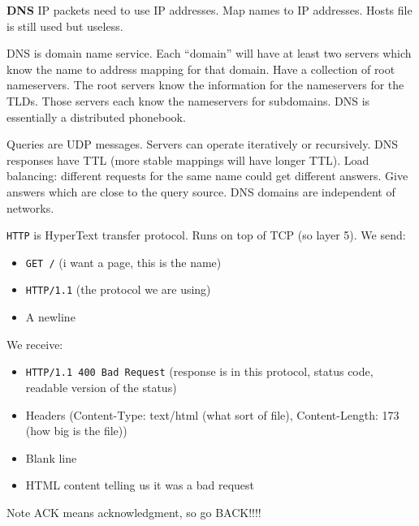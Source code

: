 \documentclass[10pt, a4paper]{article}
\begin{document}
\begin{multicols}{4}
    \textbf{DNS} IP packets need to use IP addresses. Map names to IP addresses. Hosts file is still used but useless.

    DNS is domain name service. Each ``domain'' will have at least two servers which know the name to address mapping for that domain. Have a collection of root nameservers. The root servers know the information for the nameservers for the TLDs. Those servers each know the nameservers for subdomains. DNS is essentially a distributed phonebook.
 
    Queries are UDP messages. Servers can operate iteratively or recursively. DNS responses have TTL (more stable mappings will have longer TTL). Load balancing: different requests for the same name could get different answers. Give answers which are close to the query source. DNS domains are independent of networks.

    \texttt{HTTP} is HyperText transfer protocol. Runs on top of TCP (so layer 5). We send:
    \begin{itemize}
        \item \texttt{GET /} (i want a page, this is the name)
        \item \texttt{HTTP/1.1} (the protocol we are using)
        \item A newline
    \end{itemize}
    We receive:
    \begin{itemize}
        \item \texttt{HTTP/1.1 400 Bad Request} (response is in this protocol, status code, readable version of the status)
        \item Headers (Content-Type: text/html (what sort of file), Content-Length: 173 (how big is the file))
        \item Blank line
        \item HTML content telling us it was a bad request
    \end{itemize}

    Note ACK means acknowledgment, so go BACK!!!!


\end{multicols}
\end{document}
